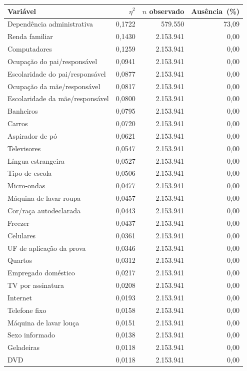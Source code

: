 \begin{tabularx}{\linewidth}{@{}Xrrr@{}}\toprule Variável & $\eta^2$ & $n$ observado & Ausência\ (\%)\\\midrule
Dependência administrativa & 0,1722 & 579.550 & 73,09 \\
Renda familiar & 0,1430 & 2.153.941 & 0,00 \\
Computadores & 0,1259 & 2.153.941 & 0,00 \\
Ocupação do pai/responsável & 0,0941 & 2.153.941 & 0,00 \\
Escolaridade do pai/responsável & 0,0877 & 2.153.941 & 0,00 \\
Ocupação da mãe/responsável & 0,0817 & 2.153.941 & 0,00 \\
Escolaridade da mãe/responsável & 0,0800 & 2.153.941 & 0,00 \\
Banheiros & 0,0795 & 2.153.941 & 0,00 \\
Carros & 0,0720 & 2.153.941 & 0,00 \\
Aspirador de pó & 0,0621 & 2.153.941 & 0,00 \\
Televisores & 0,0547 & 2.153.941 & 0,00 \\
Língua estrangeira & 0,0527 & 2.153.941 & 0,00 \\
Tipo de escola & 0,0506 & 2.153.941 & 0,00 \\
Micro-ondas & 0,0477 & 2.153.941 & 0,00 \\
Máquina de lavar roupa & 0,0457 & 2.153.941 & 0,00 \\
Cor/raça autodeclarada & 0,0443 & 2.153.941 & 0,00 \\
Freezer & 0,0437 & 2.153.941 & 0,00 \\
Celulares & 0,0361 & 2.153.941 & 0,00 \\
UF de aplicação da prova & 0,0346 & 2.153.941 & 0,00 \\
Quartos & 0,0312 & 2.153.941 & 0,00 \\
Empregado doméstico & 0,0217 & 2.153.941 & 0,00 \\
TV por assinatura & 0,0208 & 2.153.941 & 0,00 \\
Internet & 0,0193 & 2.153.941 & 0,00 \\
Telefone fixo & 0,0158 & 2.153.941 & 0,00 \\
Máquina de lavar louça & 0,0151 & 2.153.941 & 0,00 \\
Sexo informado & 0,0138 & 2.153.941 & 0,00 \\
Geladeiras & 0,0118 & 2.153.941 & 0,00 \\
DVD & 0,0118 & 2.153.941 & 0,00 \\

\end{tabularx}
